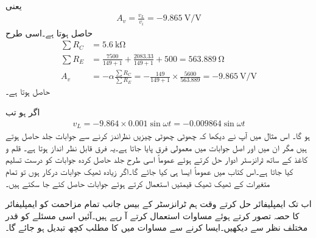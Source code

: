 یعنی
\begin{align*}
A_v=\frac{v_L}{v_i}=\SI{-9.865}{\volt \per \volt}
\end{align*}
حاصل ہوتا ہے۔اسی طرح
\begin{align*}
\sum R_C&=\SI{5.6}{\kilo \ohm}\\
\sum R_E&=\frac{7500}{149+1}+\frac{2083.33}{149+1}+500=\SI{563.889}{\ohm}\\
A_v&=- \alpha \frac{\sum R_C}{\sum R_E}=-\frac{149}{149+1} \times \frac{5600}{563.889}=\SI{-9.865}{\volt \per \volt}
\end{align*}
حاصل ہوتا ہے۔

اگر   ہو تب
\begin{align*}
v_L=-9.864 \times 0.001 \sin \omega t=-0.009864 \sin \omega t
\end{align*}
ہو گا۔
اس مثال میں آپ نے دیکھا کہ چھوٹی چھوٹی چیزیں نظراندز کرنے سے جوابات جلد حاصل ہوتے ہیں مگر ان میں اور اصل جوابات میں معمولی فرق پایا جاتا ہے۔یہ فرق قابل نظر انداز ہوتا ہے۔ قلم و کاغذ کے ساتھ ٹرانزسٹر ادوار حل کرتے ہوئے عموماً اسی طرح جلد حاصل کردہ جوابات کو درست تسلیم کیا جاتا ہے۔اس کتاب میں عموماً ایسا ہی کیا جائے گا۔اگر زیادہ ٹھیک جوابات درکار ہوں تو تمام متغیرات کے ٹھیک ٹھیک قیمتیں استعمال کرتے ہوئے جوابات حاصل کئے جا سکتے ہیں۔

اب تک ایمپلیفائر حل کرتے وقت ہم  ٹرانزسٹر کے بیس جانب تمام مزاحمت کو ایمپلیفائر کا حصہ تصور کرتے ہوئے مساوات  استعمال کرتے آ رہے ہیں۔آئیں اسی مسئلے کو قدر مختلف نظر سے دیکھیں۔ایسا کرنے سے مساوات  میں  کا مطلب کچھ تبدیل ہو جائے گا۔

